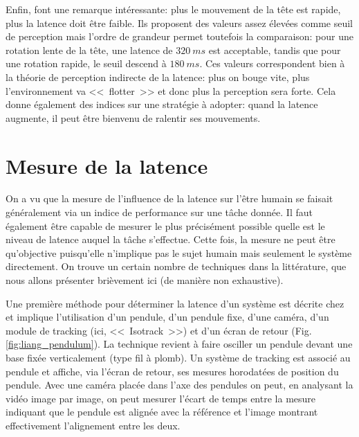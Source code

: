 	\par Enfin, \citep{allison_tolerance_2001} font une remarque intéressante: plus le mouvement de la tête est rapide, plus la latence doit être faible. Ils proposent des valeurs assez élevées comme seuil de perception mais l'ordre de grandeur permet toutefois la comparaison: pour une rotation lente de la tête, une latence de $320~ms$ est acceptable, tandis que pour une rotation rapide, le seuil descend à $180~ms$. Ces valeurs correspondent bien à la théorie de perception indirecte de la latence: plus on bouge vite, plus l'environnement va <<~flotter~>> et donc plus la perception sera forte. Cela donne également des indices sur une stratégie à adopter: quand la latence augmente, il peut être bienvenu de ralentir ses mouvements.
	
	\section{Mesure de la latence}
	\par On a vu que la mesure de l'influence de la latence sur l'être humain se faisait généralement via un indice de performance sur une tâche donnée. Il faut également être capable de mesurer le plus précisément possible quelle est le niveau de latence auquel la tâche s'effectue. Cette fois, la mesure ne peut être qu'objective puisqu'elle n'implique pas le sujet humain mais seulement le système directement. On trouve un certain nombre de techniques dans la littérature, que nous allons présenter brièvement ici (de manière non exhaustive).
	
	\par Une première méthode pour déterminer la latence d'un système est décrite chez  \citep{liang_temporal-spatial_1991} et implique l'utilisation d'un pendule, d'un pendule fixe, d'une caméra, d'un module de tracking (ici, <<~Isotrack~>>) et d'un écran de retour (Fig. \ref{fig:liang_pendulum}). La technique revient à faire osciller un pendule devant une base fixée verticalement (type fil à plomb). Un système de tracking est associé au pendule et affiche, via l'écran de retour, ses mesures horodatées de position du pendule. Avec une caméra placée dans l'axe des pendules on peut, en analysant la vidéo image par image, on peut mesurer l'écart de temps entre la mesure indiquant que le pendule est alignée avec la référence et l'image montrant effectivement l'alignement entre les deux.
	
